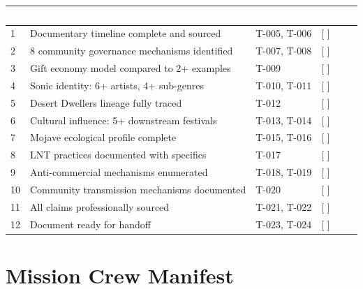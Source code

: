 \documentclass[11pt,letterpaper]{article}
\newcommand{\tableheader}[1]{\textbf{\sffamily\textcolor{white}{#1}}}
\begin{document}
\begin{center}
\begin{tabularx}{\textwidth}{C{0.5cm}XL{3cm}C{1.5cm}}
\toprule
{}
\tableheader{\#} & \tableheader{Success Criterion} & \tableheader{Test IDs} & \tableheader{Status} \\
 & Documentary timeline complete and sourced & T-005, T-006 & [ ] \\
2 & 8 community governance mechanisms identified & T-007, T-008 & [ ] \\
3 & Gift economy model compared to 2+ examples & T-009 & [ ] \\
4 & Sonic identity: 6+ artists, 4+ sub-genres & T-010, T-011 & [ ] \\
5 & Desert Dwellers lineage fully traced & T-012 & [ ] \\
6 & Cultural influence: 5+ downstream festivals & T-013, T-014 & [ ] \\
7 & Mojave ecological profile complete & T-015, T-016 & [ ] \\
8 & LNT practices documented with specifics & T-017 & [ ] \\
9 & Anti-commercial mechanisms enumerated & T-018, T-019 & [ ] \\
10 & Community transmission mechanisms documented & T-020 & [ ] \\
11 & All claims professionally sourced & T-021, T-022 & [ ] \\
12 & Document ready for handoff & T-023, T-024 & [ ] \\
\bottomrule
\end{tabularx}
\end{center}

\section{Mission Crew Manifest}
\end{document}
